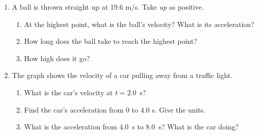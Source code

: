 \documentclass[12pt, twoside]{article}
\begin{document}
\begin{enumerate}[itemsep=0.6cm]
\newpage

\item A ball is thrown straight up at 19.6 m/s. Take \emph{up} as positive.
  \begin{enumerate}[itemsep=0.4cm]
    \item At the highest point, what is the ball's velocity? What is its
      acceleration?
      \vspace{1.6cm}
    \item How long does the ball take to reach the highest point?
      \vspace{2.8cm}
    \item How high does it go?
      \vspace{2.8cm}
  \end{enumerate}

\item The graph shows the velocity of a car pulling away from a traffic light.

  \begin{minipage}[t]{0.58\linewidth}
    \vspace{0pt}
  \end{minipage}
  \hfill
  \begin{minipage}[t]{0.38\linewidth}
    \vspace{0pt}
    \begin{enumerate}[itemsep=1.6cm]
      \item What is the car's velocity at \mbox{$t = 2.0$ s}?
      \item Find the car's acceleration from 0 to 4.0 s. Give the units.
      \item What is the acceleration from 4.0~s to 8.0~s? What is the car doing?
    \end{enumerate}
  \end{minipage}

\end{enumerate}
\end{document}
